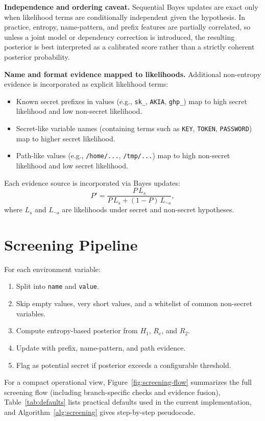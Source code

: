 \documentclass[10pt]{article}
\begin{document}
\textbf{Independence and ordering caveat.}
Sequential Bayes updates are exact only when likelihood terms are conditionally independent given the hypothesis. In practice, entropy, name-pattern, and prefix features are partially correlated, so unless a joint model or dependency correction is introduced, the resulting posterior is best interpreted as a calibrated score rather than a strictly coherent posterior probability.

\textbf{Name and format evidence mapped to likelihoods.}
Additional non-entropy evidence is incorporated as explicit likelihood terms:
\begin{itemize}
  \item Known secret prefixes in values (e.g., \texttt{sk\_}, \texttt{AKIA}, \texttt{ghp\_}) map to high secret likelihood and low non-secret likelihood.
  \item Secret-like variable names (containing terms such as \texttt{KEY}, \texttt{TOKEN}, \texttt{PASSWORD}) map to higher secret likelihood.
  \item Path-like values (e.g., \texttt{/home/...}, \texttt{/tmp/...}) map to high non-secret likelihood and low secret likelihood.
\end{itemize}

Each evidence source is incorporated via Bayes updates:
\[
P' = \frac{P\,L_s}{P\,L_s + (1-P)\,L_{\neg s}},
\]
where $L_s$ and $L_{\neg s}$ are likelihoods under secret and non-secret hypotheses.

\section*{Screening Pipeline}

For each environment variable:
\begin{enumerate}
  \item Split into \texttt{name} and \texttt{value}.
  \item Skip empty values, very short values, and a whitelist of common non-secret variables.
  \item Compute entropy-based posterior from $H_1$, $R_c$, and $R_2$.
  \item Update with prefix, name-pattern, and path evidence.
  \item Flag as potential secret if posterior exceeds a configurable threshold.
\end{enumerate}

For a compact operational view, Figure~\ref{fig:screening-flow} summarizes the full screening flow (including branch-specific checks and evidence fusion), Table~\ref{tab:defaults} lists practical defaults used in the current implementation, and Algorithm~\ref{alg:screening} gives step-by-step pseudocode.
\end{document}
